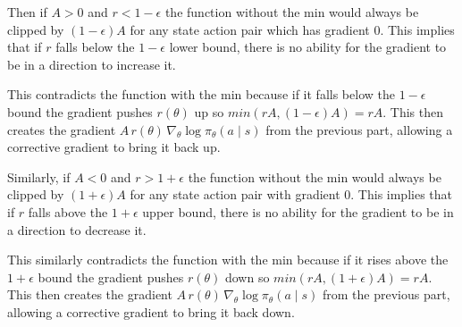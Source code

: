 \documentclass[12pt]{amsart}
\begin{document}
\begin{problem}
\begin{subproblem}
      Then if $A>0$ and $r<1-\epsilon$ the function without the min would always be clipped by $(1-\epsilon)A$ for any state action pair which has gradient $0$. This implies that if $r$ falls below the $1-\epsilon$ lower bound, there is no ability for the gradient to be in a direction to increase it.

      This contradicts the function with the min because if it falls below the $1-\epsilon$ bound the gradient pushes $r(\theta)$ up so $min(rA, (1-\epsilon)A)=rA$. This then creates the gradient $A\,r(\theta)\,\nabla_\theta\log\pi_\theta(a\mid s)$ from the previous part, allowing a corrective gradient to bring it back up.

      Similarly, if $A<0$ and $r>1+\epsilon$ the function without the min would always be clipped by $(1+\epsilon)A$ for any state action pair with gradient $0$. This implies that if $r$ falls above the $1+\epsilon$ upper bound, there is no ability for the gradient to be in a direction to decrease it.

      This similarly contradicts the function with the min because if it rises above the $1+\epsilon$ bound the gradient pushes $r(\theta)$ down so $min(rA, (1+\epsilon)A)=rA$. This then creates the gradient $A\,r(\theta)\,\nabla_\theta\log\pi_\theta(a\mid s)$ from the previous part, allowing a corrective gradient to bring it back down.
    \end{subproblem}
  \end{problem}
\end{document}
